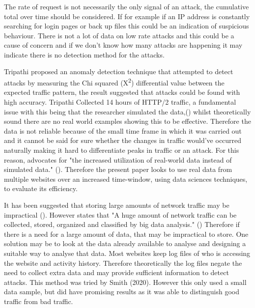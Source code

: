 The rate of request is not necessarily the only signal of an attack, the cumulative total over time should be considered. If for example if an IP address is constantly searching for login pages or back up files this could be an indication of suspicious behaviour. There is not a lot of data on low rate attacks and this could be a cause of concern and if we don't know how many attacks are happening it may indicate there is no detection method for the attacks. 

 
 Tripathi proposed an anomaly detection technique that attempted to detect attacks by measuring the Chi squared (X\textsuperscript{\small2}) differential value between the expected traffic pattern, the result suggested that attacks could be found with high accuracy. Tripathi Collected 14 hours of HTTP/2 traffic, a fundamental issue with this being that the researcher simulated the data,(\cite{tripathi2018slow}) whilst theoretically sound there are no real world examples showing this to be effective. Therefore the data is not reliable because of the small time frame in which it was carried out and  it cannot be said for sure whether the changes in traffic would've occurred naturally making it hard to differentiate peaks in traffic or an attack. For this reason, \citeauthor{8500383} advocates for "the increased utilization of real-world data instead of simulated data." (\cite{8500383}). Therefore the present paper looks to use real data from multiple websites over an increased time-window, using data sciences techniques, to evaluate its efficiency. 

It has been suggested that storing large amounts of network traffic may be impractical (\cite{staniford2002practical}). However \citeauthor{9016229} states that  "A huge amount of network traffic can be collected, stored, organized and classified by big data analysis." (\cite{9016229}) Therefore if there is a need for a large amount of data, that may be impractical to store. One solution may be to look at the data already available to analyse and designing a suitable way to analyse that data. Most websites keep log files of who is accessing the website and activity history. Therefore theoretically the log files negate the need to collect extra data and may provide sufficient information to detect attacks. This method was tried by Smith (2020). However this only used a small data sample, but did have promising results as it was able to distinguish good traffic from bad traffic. 

